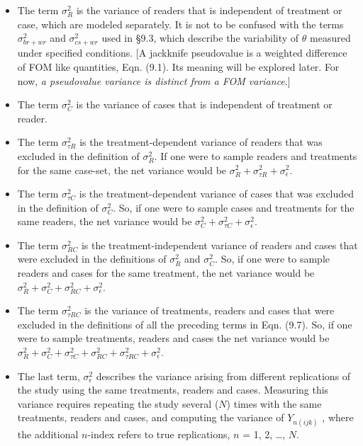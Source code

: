 \documentclass[
]{book}
\providecommand{\tightlist}{%
  \setlength{\itemsep}{0pt}\setlength{\parskip}{0pt}}
\begin{document}
\begin{itemize}
\tightlist
\item
  The term \(\sigma_{R}^{2}\) is the variance of readers that is independent of treatment or case, which are modeled separately. It is not to be confused with the terms \(\sigma_{br+wr}^{2}\) and \(\sigma_{cs+wr}^{2}\) used in §9.3, which describe the variability of \(\theta\) measured under specified conditions. {[}A jackknife pseudovalue is a weighted difference of FOM like quantities, Eqn. (9.1). Its meaning will be explored later. For now, \emph{a pseudovalue variance is distinct from a FOM variance}.{]}
\item
  The term \(\sigma_{C}^{2}\) is the variance of cases that is independent of treatment or reader.
\item
  The term \(\sigma_{\tau R}^{2}\) is the treatment-dependent variance of readers that was excluded in the definition of \(\sigma_{R}^{2}\). If one were to sample readers and treatments for the same case-set, the net variance would be \(\sigma_{R}^{2}+\sigma_{\tau R}^{2}+\sigma_{\epsilon}^{2}\).
\item
  The term \(\sigma_{\tau C}^{2}\) is the treatment-dependent variance of cases that was excluded in the definition of \(\sigma_{C}^{2}\). So, if one were to sample cases and treatments for the same readers, the net variance would be \(\sigma_{C}^{2}+\sigma_{\tau C}^{2}+\sigma_{\epsilon}^{2}\).
\item
  The term \(\sigma_{RC}^{2}\) is the treatment-independent variance of readers and cases that were excluded in the definitions of \(\sigma_{R}^{2}\) and \(\sigma_{C}^{2}\). So, if one were to sample readers and cases for the same treatment, the net variance would be \(\sigma_{R}^{2}+\sigma_{C}^{2}+\sigma_{RC}^{2}+\sigma_{\epsilon}^{2}\).
\item
  The term \(\sigma_{\tau RC}^{2}\) is the variance of treatments, readers and cases that were excluded in the definitions of all the preceding terms in Eqn. (9.7). So, if one were to sample treatments, readers and cases the net variance would be \(\sigma_{R}^{2}+\sigma_{C}^{2}+\sigma_{\tau C}^{2}+\sigma_{RC}^{2}+\sigma_{\tau RC}^{2}+\sigma_{\epsilon}^{2}\).
\item
  The last term, \(\sigma_{\epsilon}^{2}\) describes the variance arising from different replications of the study using the same treatments, readers and cases. Measuring this variance requires repeating the study several (\(N\)) times with the same treatments, readers and cases, and computing the variance of \(Y_{n(ijk)}\) , where the additional \(n\)-index refers to true replications, \(n\) = 1, 2, \ldots, \(N\).
\end{itemize}
\end{document}

